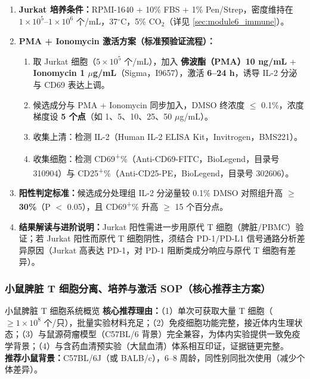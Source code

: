 \documentclass[12pt,a4paper,twoside]{article}
\begin{document}
\begin{enumerate}
  \item \textbf{Jurkat 培养条件：}RPMI-1640 + 10\% FBS + 1\% Pen/Strep，密度维持在 $1 \times 10^5$--$1 \times 10^6$ 个/mL，37$^{\circ}$C，5\% CO$_2$（详见 \ref{sec:module6_immune}）。
  \item \textbf{PMA + Ionomycin 激活方案（标准预验证流程）：}
  \begin{enumerate}
    \item 取 Jurkat 细胞（$5 \times 10^5$ 个/mL），加入 \textbf{佛波酯（PMA）10 ng/mL} + \textbf{Ionomycin 1 $\mu$g/mL}（Sigma，I9657），激活 \textbf{6--24 h}，诱导 IL-2 分泌与 CD69 表达上调。
    \item 候选成分与 PMA + Ionomycin 同步加入，DMSO 终浓度 $\leq$ 0.1\%，浓度梯度设 \textbf{5 个点}（如 1、5、10、25、50 $\mu$g/mL）。
    \item 收集上清：检测 IL-2（Human IL-2 ELISA Kit，Invitrogen，BMS221）。
    \item 收集细胞：检测 CD69\textsuperscript{+}\%（Anti-CD69-FITC，BioLegend，目录号 310904）与 CD25\textsuperscript{+}\%（Anti-CD25-PE，BioLegend，目录号 302606）。
  \end{enumerate}
  \item \textbf{阳性判定标准：}候选成分处理组 IL-2 分泌量较 0.1\% DMSO 对照组升高 \textbf{$\geq$ 30\%}（P $<$ 0.05），且 CD69\textsuperscript{+}\% 升高 $\geq$ 15 个百分点。
  \item \textbf{结果解读与进阶说明：}Jurkat 阳性需进一步用原代 T 细胞（脾脏/PBMC）验证；若 Jurkat 阳性而原代 T 细胞阴性，须结合 PD-1/PD-L1 信号通路分析差异原因（Jurkat 高表达 PD-1，对 PD-1 阻断类成分响应与原代 T 细胞有差异）。
\end{enumerate}

\subsubsection{小鼠脾脏 T 细胞分离、培养与激活 SOP（核心推荐主方案）}
\label{sec:mouse_spleen_tcell}

\begin{infobox}{小鼠脾脏 T 细胞系统概览}
\textbf{核心推荐理由：}（1）单次可获取大量 T 细胞（$\geq 1 \times 10^8$ 个/只），批量实验材料充足；（2）免疫细胞功能完整，接近体内生理状态；（3）与鼠源荷瘤模型（C57BL/6 背景）完全兼容，为体内实验提供一致免疫学背景；（4）与含药血清预实验（大鼠血清）体系相互印证，证据链更完整。\\
\textbf{推荐小鼠背景：}C57BL/6J（或 BALB/c），6--8 周龄，同性别同批次使用（减少个体差异）。
\end{infobox}
\end{document}
